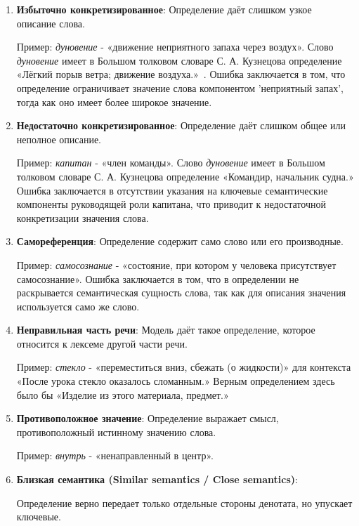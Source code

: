 \documentclass[LI,VKR]{HSEUniversity}
\begin{document}
\begin{enumerate}
    \item \textbf{Избыточно конкретизированное}:
Определение даёт слишком узкое описание слова.

Пример: \emph{дуновение} - «движение неприятного запаха через воздух».
Слово \textit{дуновение} имеет в Большом толковом словаре С. А. Кузнецова определение
«Лёгкий порыв ветра; движение воздуха.»~\cite{TolkovyKuznetsov}.
Ошибка заключается в том, что определение ограничивает значение слова компонентом
’неприятный запах’, тогда как оно имеет более широкое значение.

    \item \textbf{Недостаточно конкретизированное}:
Определение даёт слишком общее или неполное описание.

Пример: \emph{капитан} - «член команды».
Слово \textit{дуновение} имеет в Большом толковом словаре С. А. Кузнецова определение
«Командир, начальник судна.»
Ошибка заключается в отсутствии указания на ключевые семантические компоненты
руководящей роли капитана, что приводит к недостаточной конкретизации значения слова.

    \item \textbf{Самореференция}:
Определение содержит само слово или его производные.

Пример: \emph{самосознание} - «состояние, при котором у человека присутствует самосознание».
Ошибка заключается в том, что в определении не раскрывается семантическая сущность слова,
так как для описания значения используется само же слово.

    \item \textbf{Неправильная часть речи}:
Модель даёт такое определение, которое относится к лексеме другой части речи.

Пример: \emph{стекло} - «переместиться вниз, сбежать (о жидкости)» для контекста «После урока стекло оказалось сломанным.»
Верным определением здесь было бы «Изделие из этого материала, предмет.»

    \item \textbf{Противоположное значение}:
Определение выражает смысл, противоположный истинному значению слова.

Пример: \emph{внутрь} - «ненаправленный в центр».
    \item \textbf{Близкая семантика (Similar semantics / Close semantics)}:

Определение верно передает только отдельные стороны денотата, но упускает ключевые.


\end{enumerate}
\end{document}
